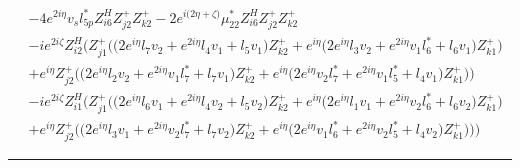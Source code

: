 \begin{align}
 &-4 e^{2 i \eta } v_s l_{5p}^* Z_{{i 6}}^{H} Z_{{j 2}}^{+} Z_{{k 2}}^{+} -2 e^{i \Big(2 \eta +\zeta \Big)} \mu_{22}^* Z_{{i 6}}^{H} Z_{{j 2}}^{+} Z_{{k 2}}^{+} \nonumber \\ 
 &-i e^{2 i \zeta } Z_{{i 2}}^{H} \Big(Z_{{j 1}}^{+} \Big(\Big(2 e^{i \eta } l_7 v_2  + e^{2 i \eta } l_4 v_1  + l_5 v_1 \Big)Z_{{k 2}}^{+}  + e^{i \eta } \Big(2 e^{i \eta } l_3 v_2  + e^{2 i \eta } v_1 l_6^*  + l_6 v_1 \Big)Z_{{k 1}}^{+} \Big)\nonumber \\ 
 &+e^{i \eta } Z_{{j 2}}^{+} \Big(\Big(2 e^{i \eta } l_2 v_2  + e^{2 i \eta } v_1 l_7^*  + l_7 v_1 \Big)Z_{{k 2}}^{+}  + e^{i \eta } \Big(2 e^{i \eta } v_2 l_7^*  + e^{2 i \eta } v_1 l_5^*  + l_4 v_1 \Big)Z_{{k 1}}^{+} \Big)\Big)\nonumber \\ 
 &-i e^{2 i \zeta } Z_{{i 1}}^{H} \Big(Z_{{j 1}}^{+} \Big(\Big(2 e^{i \eta } l_6 v_1  + e^{2 i \eta } l_4 v_2  + l_5 v_2 \Big)Z_{{k 2}}^{+}  + e^{i \eta } \Big(2 e^{i \eta } l_1 v_1  + e^{2 i \eta } v_2 l_6^*  + l_6 v_2 \Big)Z_{{k 1}}^{+} \Big)\nonumber \\ 
 &+e^{i \eta } Z_{{j 2}}^{+} \Big(\Big(2 e^{i \eta } l_3 v_1  + e^{2 i \eta } v_2 l_7^*  + l_7 v_2 \Big)Z_{{k 2}}^{+}  + e^{i \eta } \Big(2 e^{i \eta } v_1 l_6^*  + e^{2 i \eta } v_2 l_5^*  + l_4 v_2 \Big)Z_{{k 1}}^{+} \Big)\Big)\Big)\end{align} 
\hrule 
